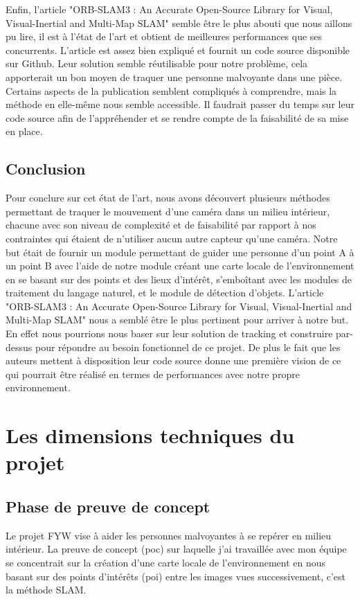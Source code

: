\documentclass[11pt]{article}
\begin{document}
      Enfin, l'article "ORB-SLAM3 : An Accurate Open-Source Library for Visual, Visual-Inertial and Multi-Map SLAM" semble être le plus abouti
      que nous aillons pu lire, il est à l'état de l'art et obtient de meilleures performances que ses concurrents. L'article est assez bien expliqué
      et fournit un code source disponible sur Github. Leur solution semble réutilisable pour notre problème, cela apporterait un bon moyen
      de traquer une personne malvoyante dans une pièce. Certains aspects de la publication semblent compliqués à comprendre, mais la méthode en 
      elle-même nous semble accessible. Il faudrait passer du temps sur leur code source afin de l'appréhender et se rendre compte de la faisabilité
      de sa mise en place.

    \pagebreak

    \subsection{Conclusion}
      Pour conclure sur cet état de l'art, nous avons découvert plusieurs méthodes permettant de traquer le mouvement d'une caméra dans un
      milieu intérieur, chacune avec son niveau de complexité et de faisabilité par rapport à nos contraintes qui étaient de n'utiliser aucun
      autre capteur qu'une caméra. Notre but était de fournir un module permettant de guider une personne d'un point A à un point B avec 
      l'aide de notre module créant une carte locale de l'environnement en se basant sur des points et des lieux d'intérêt, 
      s'emboîtant avec les modules de traitement du langage naturel, et le module de détection d'objets. 
      L'article "ORB-SLAM3 : An Accurate Open-Source Library for Visual, Visual-Inertial and Multi-Map SLAM" 
      nous a semblé être le plus pertinent pour arriver à notre but. En effet nous pourrions nous baser sur leur solution de tracking et construire 
      par-dessus pour répondre au besoin fonctionnel de ce projet.
      De plus le fait que les auteurs mettent à disposition leur code source donne une première vision de ce qui pourrait être réalisé en termes de 
      performances avec notre propre environnement.

    \pagebreak

  \section{Les dimensions techniques du projet}
    \subsection{Phase de preuve de concept}
      Le projet FYW vise à aider les personnes malvoyantes à se repérer en milieu intérieur. 
      La preuve de concept (\acrshort{poc}) sur laquelle j'ai travaillée avec mon équipe se concentrait sur la création d'une carte locale
      de l'environnement en nous basant sur des points d'intérêts (\acrshort{poi}) entre les images vues successivement, c'est la méthode
      SLAM.
\end{document}
